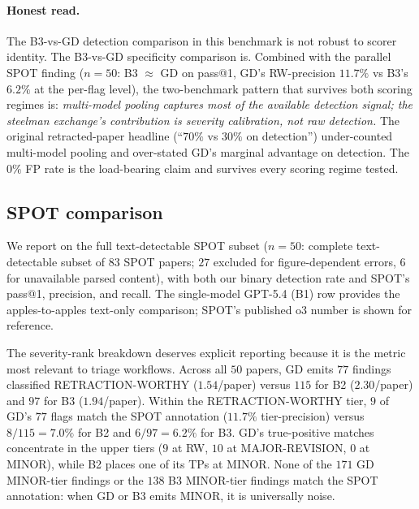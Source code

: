 \documentclass[11pt]{article}
\theoremstyle{definition}
\begin{document}
\paragraph{Honest read.} The B3-vs-GD detection comparison in this benchmark is not robust to scorer identity. The B3-vs-GD specificity comparison is. Combined with the parallel SPOT finding ($n = 50$: B3 $\approx$ GD on pass@1, GD's RW-precision $11.7\%$ vs B3's $6.2\%$ at the per-flag level), the two-benchmark pattern that survives both scoring regimes is: \emph{multi-model pooling captures most of the available detection signal; the steelman exchange's contribution is severity calibration, not raw detection.} The original retracted-paper headline (``$70\%$ vs $30\%$ on detection'') under-counted multi-model pooling and over-stated GD's marginal advantage on detection. The $0\%$ FP rate is the load-bearing claim and survives every scoring regime tested.

\subsection{SPOT comparison}
\label{sec:results:spot}


We report on the full text-detectable SPOT subset ($n = 50$: complete text-detectable subset of $83$ SPOT papers; $27$ excluded for figure-dependent errors, $6$ for unavailable parsed content), with both our binary detection rate and SPOT's pass@1, precision, and recall. The single-model GPT-5.4 (B1) row provides the apples-to-apples text-only comparison; SPOT's published o3 number is shown for reference.

The severity-rank breakdown deserves explicit reporting because it is the metric most relevant to triage workflows. Across all $50$ papers, GD emits $77$ findings classified RETRACTION-WORTHY ($1.54$/paper) versus $115$ for B2 ($2.30$/paper) and $97$ for B3 ($1.94$/paper). Within the RETRACTION-WORTHY tier, $9$ of GD's $77$ flags match the SPOT annotation ($11.7\%$ tier-precision) versus $8/115 = 7.0\%$ for B2 and $6/97 = 6.2\%$ for B3. GD's true-positive matches concentrate in the upper tiers ($9$ at RW, $10$ at MAJOR-REVISION, $0$ at MINOR), while B2 places one of its TPs at MINOR. None of the $171$ GD MINOR-tier findings or the $138$ B3 MINOR-tier findings match the SPOT annotation: when GD or B3 emits MINOR, it is universally noise.
\end{document}
